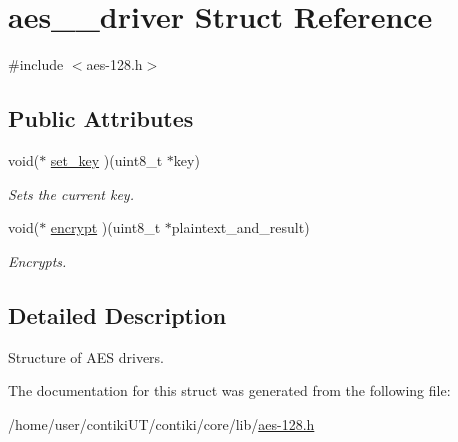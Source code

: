 \hypertarget{structaes__128__driver}{}\section{aes\+\_\+\_\+driver Struct Reference}
\label{structaes__128__driver}


{\ttfamily \#include $<$aes-\/128.\+h$>$}

\subsection*{Public Attributes}
\begin{DoxyCompactItemize}
\item 
\hypertarget{structaes__128__driver_a6ef7d120f74dd747839ffb8d2164e83f}{}void($\ast$ \hyperlink{structaes__128__driver_a6ef7d120f74dd747839ffb8d2164e83f}{set\+\_\+key} )(uint8\+\_\+t $\ast$key)\label{structaes__128__driver_a6ef7d120f74dd747839ffb8d2164e83f}

\begin{DoxyCompactList}\small\item\em Sets the current key. \end{DoxyCompactList}\item 
\hypertarget{structaes__128__driver_addc7f69d3b1224d39180ad04f9387beb}{}void($\ast$ \hyperlink{structaes__128__driver_addc7f69d3b1224d39180ad04f9387beb}{encrypt} )(uint8\+\_\+t $\ast$plaintext\+\_\+and\+\_\+result)\label{structaes__128__driver_addc7f69d3b1224d39180ad04f9387beb}

\begin{DoxyCompactList}\small\item\em Encrypts. \end{DoxyCompactList}\end{DoxyCompactItemize}


\subsection{Detailed Description}
Structure of A\+E\+S drivers. 

The documentation for this struct was generated from the following file\+:\begin{DoxyCompactItemize}
\item 
/home/user/contiki\+U\+T/contiki/core/lib/\hyperlink{aes-128_8h}{aes-\/128.\+h}\end{DoxyCompactItemize}
